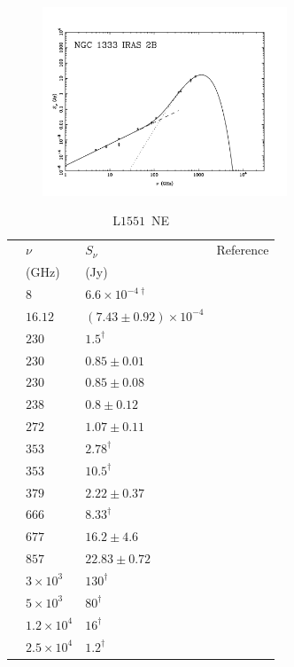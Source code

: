 \documentclass[9pt]{extarticle}   	%
\begin{document}
\begin{figure}[htbp]
\begin{center}
\includegraphics[width=0.65\textwidth]{plots/HH7-11-IRAS2B.pdf}
\label{default}
\end{center}
\end{figure}

\clearpage



\begin{table}
\caption{L$1551$~NE}
\begin{center}
\begin{tabular}{llll}
\hline
 & $\nu$ & $S_\nu$ & Reference\\
 & (GHz) & (Jy) & \\
\hline
 & $8$ & $6.6\times10^{-4\dag}$ & \citet{2002AJ....124.1045R}\\
 & $16.12$ & $(7.43\pm0.92)\times10^{-4}$ & \citet{2012MNRAS.423.1089A}\\
 & $230$ & $1.5^{\dag}$ & \citet{2001AA...365..440M}\\
 & $230$ & $0.85\pm0.01$ & \citet{2005ApJ...631.1134A}\\
 & $230$ & $0.85\pm0.08$ & \citet{2000ApJ...533L.143M}\\
 & $238$ & $0.8\pm0.12$ & \citet{1993ApJ...406L..71B}\\
 & $272$ & $1.07\pm0.11$ & \citet{1993ApJ...406L..71B}\\
 & $353$ & $2.78^{\dag}$ & \citet{2006ApJ...645..357M}\\
 & $353$ & $10.5^{\dag}$ & \citet{2008ApJS..175..277D}\\
 & $379$ & $2.22\pm0.37$ & \citet{1993ApJ...406L..71B}\\
 & $666$ & $8.33^{\dag}$ & \citet{2006ApJ...645..357M}\\
 & $677$ & $16.2\pm4.6$ & \citet{1993ApJ...406L..71B}\\
 & $857$ & $22.83\pm0.72$ & \citet{2005ApJ...631.1134A}\\
 & $3\times10^{3}$ & $130^{\dag}$ & \citet{1984ApJ...278L..49E}\\
 & $5\times10^{3}$ & $80^{\dag}$ & \citet{1984ApJ...278L..49E}\\
 & $1.2\times10^{4}$ & $16^{\dag}$ & \citet{1984ApJ...278L..49E}\\
 & $2.5\times10^{4}$ & $1.2^{\dag}$ & \citet{1984ApJ...278L..49E}\\
\end{tabular}
\end{center}
\label{default}
\end{table}%
\end{document}
